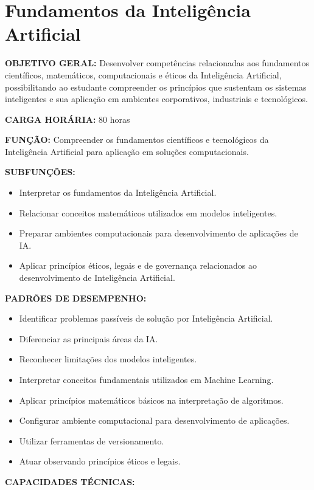 \section{Fundamentos da Inteligência Artificial}

\textbf{OBJETIVO GERAL:}
Desenvolver competências relacionadas aos fundamentos científicos, matemáticos, computacionais e éticos da Inteligência Artificial, possibilitando ao estudante compreender os princípios que sustentam os sistemas inteligentes e sua aplicação em ambientes corporativos, industriais e tecnológicos.

\textbf{CARGA HORÁRIA:} 80 horas


\textbf{FUNÇÃO:} Compreender os fundamentos científicos e tecnológicos da Inteligência Artificial para aplicação em soluções computacionais.


\textbf{SUBFUNÇÕES:}
\begin{itemize}
\item Interpretar os fundamentos da Inteligência Artificial.
\item Relacionar conceitos matemáticos utilizados em modelos inteligentes.
\item Preparar ambientes computacionais para desenvolvimento de aplicações de IA.
\item Aplicar princípios éticos, legais e de governança relacionados ao desenvolvimento de Inteligência Artificial.
\end{itemize} 

\textbf{PADRÕES DE DESEMPENHO:}
\begin{itemize}
    \item Identificar problemas passíveis de solução por Inteligência Artificial.
    \item Diferenciar as principais áreas da IA.
    \item Reconhecer limitações dos modelos inteligentes.
    \item Interpretar conceitos fundamentais utilizados em Machine Learning.
    \item Aplicar princípios matemáticos básicos na interpretação de algoritmos.
    \item Configurar ambiente computacional para desenvolvimento de aplicações.
    \item Utilizar ferramentas de versionamento.
    \item Atuar observando princípios éticos e legais.
\end{itemize}

\textbf{CAPACIDADES TÉCNICAS:}

